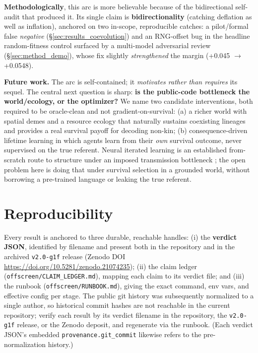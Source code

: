 \documentclass[12pt,letterpaper]{article}
\begin{document}
\textbf{Methodologically}, this arc is more believable because of the bidirectional
self-audit that produced it. Its single claim is \textbf{bidirectionality} (catching
deflation as well as inflation), anchored on two in-scope, reproducible catches: a
pilot/formal false \emph{negative} (\S\ref{sec:results_coevolution}) and an RNG-offset bug
in the headline random-fitness control surfaced by a multi-model adversarial review
(\S\ref{sec:method_demo}), whose fix slightly \emph{strengthened} the margin
(+0.045 $\to$ +0.0548).

\textbf{Future work.} The arc is self-contained; it \emph{motivates rather than requires}
its sequel. The central next question is sharp: \textbf{is the public-code bottleneck the
world/ecology, or the optimizer?} We name two candidate interventions, both required to be
oracle-clean and not gradient-on-survival: (a) a richer world with spatial demes and a
resource ecology that naturally sustains coexisting lineages and provides a real survival
payoff for decoding non-kin; (b) consequence-driven lifetime learning in which agents learn
from their \emph{own} survival outcome, never supervised on the true referent. Neural
iterated learning is an established from-scratch route to structure under an imposed
transmission bottleneck \citep{ren2020}; the open problem here is doing that under survival
selection in a grounded world, without borrowing a pre-trained language or leaking the true
referent.

\appendix
\section{Reproducibility}

Every result is anchored to three durable, reachable handles: (i) the \textbf{verdict JSON},
identified by filename and present both in the repository and in the archived
\texttt{v2.0-g1f} release (Zenodo DOI \url{https://doi.org/10.5281/zenodo.21074235}); (ii) the
claim ledger (\texttt{offscreen/CLAIM\_LEDGER.md}), mapping each claim to its verdict file; and
(iii) the runbook (\texttt{offscreen/RUNBOOK.md}), giving the exact command, env vars, and
effective config per stage. The public git history was subsequently normalized to a single
author, so historical commit hashes are not reachable in the current repository; verify each
result by its verdict filename in the repository, the \texttt{v2.0-g1f} release, or the Zenodo
deposit, and regenerate via the runbook. (Each verdict JSON's embedded
\texttt{provenance.git\_commit} likewise refers to the pre-normalization history.)
\end{document}
